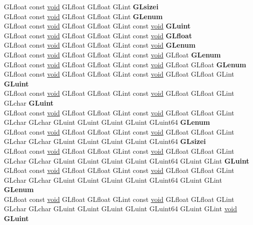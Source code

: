 \begin{DoxyCompactItemize}
\begin{tabbing}
\>GLfloat const \hyperlink{interfacevoid}{void} GLfloat GLfloat GLint {\bfseries GLsizei}\\
\>GLfloat const \hyperlink{interfacevoid}{void} GLfloat GLfloat GLint {\bfseries GLenum}\\
\>GLfloat const \hyperlink{interfacevoid}{void} GLfloat GLfloat GLint const \hyperlink{interfacevoid}{void} {\bfseries GLuint}\\
\>GLfloat const \hyperlink{interfacevoid}{void} GLfloat GLfloat GLint const \hyperlink{interfacevoid}{void} {\bfseries GLfloat}\\
\>GLfloat const \hyperlink{interfacevoid}{void} GLfloat GLfloat GLint const \hyperlink{interfacevoid}{void} {\bfseries GLenum}\\
\>GLfloat const \hyperlink{interfacevoid}{void} GLfloat GLfloat GLint const \hyperlink{interfacevoid}{void} GLfloat {\bfseries GLenum}\\
\>GLfloat const \hyperlink{interfacevoid}{void} GLfloat GLfloat GLint const \hyperlink{interfacevoid}{void} GLfloat GLfloat {\bfseries GLenum}\\
\>GLfloat const \hyperlink{interfacevoid}{void} GLfloat GLfloat GLint const \hyperlink{interfacevoid}{void} GLfloat GLfloat GLint {\bfseries GLuint}\\
\>GLfloat const \hyperlink{interfacevoid}{void} GLfloat GLfloat GLint const \hyperlink{interfacevoid}{void} GLfloat GLfloat GLint GLchar {\bfseries GLuint}\\
\>GLfloat const \hyperlink{interfacevoid}{void} GLfloat GLfloat GLint const \hyperlink{interfacevoid}{void} GLfloat GLfloat GLint GLchar GLchar GLuint GLuint GLuint GLuint GLuint64 {\bfseries GLenum}\\
\>GLfloat const \hyperlink{interfacevoid}{void} GLfloat GLfloat GLint const \hyperlink{interfacevoid}{void} GLfloat GLfloat GLint GLchar GLchar GLuint GLuint GLuint GLuint GLuint64 {\bfseries GLsizei}\\
\>GLfloat const \hyperlink{interfacevoid}{void} GLfloat GLfloat GLint const \hyperlink{interfacevoid}{void} GLfloat GLfloat GLint GLchar GLchar GLuint GLuint GLuint GLuint GLuint64 GLuint GLint {\bfseries GLuint}\\
\>GLfloat const \hyperlink{interfacevoid}{void} GLfloat GLfloat GLint const \hyperlink{interfacevoid}{void} GLfloat GLfloat GLint GLchar GLchar GLuint GLuint GLuint GLuint GLuint64 GLuint GLint {\bfseries GLenum}\\
\>GLfloat const \hyperlink{interfacevoid}{void} GLfloat GLfloat GLint const \hyperlink{interfacevoid}{void} GLfloat GLfloat GLint GLchar GLchar GLuint GLuint GLuint GLuint GLuint64 GLuint GLint \hyperlink{interfacevoid}{void} {\bfseries GLuint}\\

\end{tabbing}
\end{DoxyCompactItemize}
